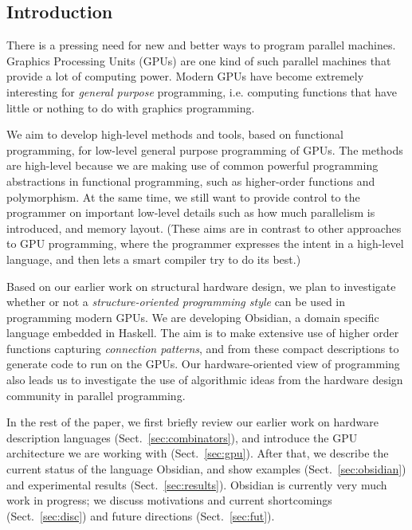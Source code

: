 \subsection{Introduction}

There is a pressing need for new and better ways to program parallel
machines. Graphics Processing Units (GPUs) are one kind of such parallel
machines that provide a lot of computing power. Modern GPUs have become
extremely interesting for {\em general purpose} programming, i.e. computing
functions that have little or nothing to do with graphics programming.

We aim to develop high-level methods and tools, based on functional
programming, for low-level general purpose programming of GPUs. The methods
are high-level because we are making use of common powerful programming
abstractions in functional programming, such as higher-order functions and
polymorphism. At the same time, we still want to provide control to the
programmer on important low-level details such as how much parallelism is
introduced, and memory layout. (These aims are in contrast to other
approaches to GPU programming, where the programmer expresses the intent in
a high-level language, and then lets a smart compiler try to do its best.)

Based on our earlier work on structural hardware design, we plan to
investigate whether or not a {\em structure-oriented programming style} can
be used in programming modern GPUs. We are developing Obsidian, a domain
specific language embedded in Haskell. The aim is to make extensive use of
higher order functions capturing {\em connection patterns}, and from these
compact descriptions to generate code to run on the GPUs. Our
hardware-oriented view of programming also leads us to investigate the use
of algorithmic ideas from the hardware design community in parallel
programming.

In the rest of the paper, we first briefly review our earlier work on
hardware description languages (Sect.\ \ref{sec:combinators}), and introduce
the GPU architecture we are working with (Sect.\ \ref{sec:gpu}). After
that, we describe the current status of the language Obsidian, and show
examples (Sect.\ \ref{sec:obsidian}) and experimental results (Sect.\
\ref{sec:results}). Obsidian is currently very much work in progress; we
discuss motivations and current shortcomings (Sect.\ \ref{sec:disc}) and
future directions (Sect.\ \ref{sec:fut}).
